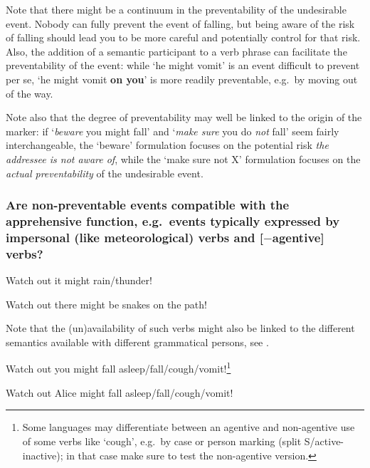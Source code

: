 \documentclass[output=paper,colorlinks,citecolor=brown]{langscibook}
\begin{document}
Note that there might be a continuum in the preventability of the undesirable event. Nobody can fully prevent the event of falling, but being aware of the risk of falling should lead you to be more careful and potentially control for that risk. Also, the addition of a semantic participant to a verb phrase can facilitate the preventability of the event: while `he might vomit' is an event difficult to prevent per se, `he might vomit \textbf{on you}' is more readily preventable, e.g.\ by moving out of the way.

Note also that the degree of preventability may well be linked to the origin of the marker: if `\textit{beware} you might fall' and `\textit{make sure} you do \textit{not} fall' seem fairly interchangeable, the `beware' formulation focuses on the potential risk \textit{the addressee is not aware of}, while the `make sure not X' formulation focuses on the \textit{actual preventability} of the undesirable event.


\subsubsection{Are non-preventable events compatible with the apprehensive function, e.g.\ events typically expressed by \textbf{impersonal} (like meteorological) verbs and \textbf{[$-$agentive]} verbs?}
\label{1.2.1}

\label{1.2.1.1}

\ea \label{p9} {\op}Watch out{\cp} it might rain\textnormal{/}thunder!
\z

\ea \label{p10} {\op}Watch out{\cp} there might be snakes on the path!
\z


Note that the (un)availability of such verbs might also be linked to the different semantics available with different grammatical persons, see .
\label{1.2.1.2}

\ea \label{p11} {\op}Watch out{\cp} you might fall asleep\textnormal{/}fall\textnormal{/}cough\textnormal{/}vomit!\footnote{Some languages may differentiate between an agentive and non-agentive use of some verbs like `cough', e.g.\ by case or person marking (split S/active-inactive); in that case make sure to test the non-agentive version.}
\z

\ea \label{p12} {\op}Watch out{\cp} Alice might fall asleep\textnormal{/}fall\textnormal{/}cough\textnormal{/}vomit!
\z
\end{document}
